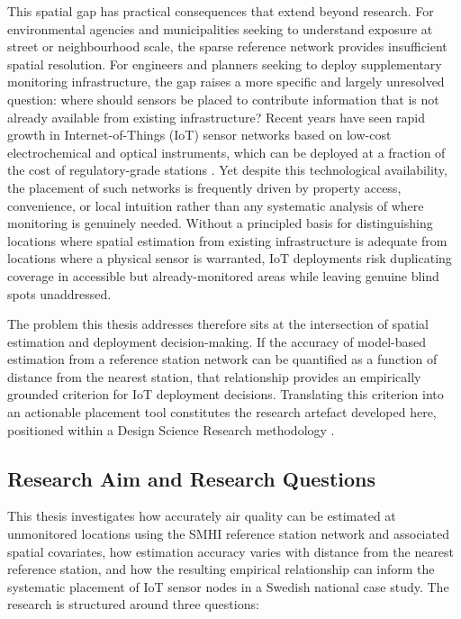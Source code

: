 \documentclass[11pt,a4paper]{article}
\let\oldsubsection\subsection
\renewcommand{\subsection}{\FloatBarrier\oldsubsection}
\begin{document}
This spatial gap has practical consequences that extend beyond research. For environmental agencies and municipalities seeking to understand exposure at street or neighbourhood scale, the sparse reference network provides insufficient spatial resolution. For engineers and planners seeking to deploy supplementary monitoring infrastructure, the gap raises a more specific and largely unresolved question: where should sensors be placed to contribute information that is not already available from existing infrastructure? Recent years have seen rapid growth in Internet-of-Things (IoT) sensor networks based on low-cost electrochemical and optical instruments, which can be deployed at a fraction of the cost of regulatory-grade stations \cite{karinthi_sustainable_aqm_2022, popescu_iot_aq_2024}. Yet despite this technological availability, the placement of such networks is frequently driven by property access, convenience, or local intuition rather than any systematic analysis of where monitoring is genuinely needed. Without a principled basis for distinguishing locations where spatial estimation from existing infrastructure is adequate from locations where a physical sensor is warranted, IoT deployments risk duplicating coverage in accessible but already-monitored areas while leaving genuine blind spots unaddressed.

The problem this thesis addresses therefore sits at the intersection of spatial estimation and deployment decision-making. If the accuracy of model-based estimation from a reference station network can be quantified as a function of distance from the nearest station, that relationship provides an empirically grounded criterion for IoT deployment decisions. Translating this criterion into an actionable placement tool constitutes the research artefact developed here, positioned within a Design Science Research methodology \cite{peffers_dsr_2007, hevner_design_science_2004}.

\subsection{Research Aim and Research Questions}

This thesis investigates how accurately air quality can be estimated at unmonitored locations using the SMHI reference station network and associated spatial covariates, how estimation accuracy varies with distance from the nearest reference station, and how the resulting empirical relationship can inform the systematic placement of IoT sensor nodes in a Swedish national case study. The research is structured around three questions:
\end{document}
